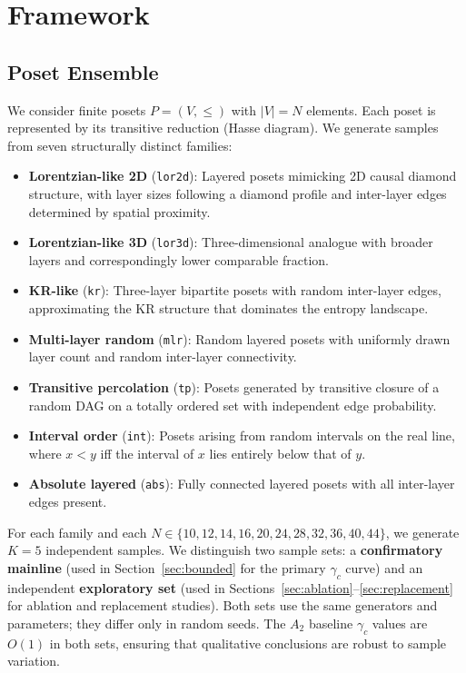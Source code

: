 \documentclass[11pt,a4paper]{article}
\begin{document}
\section{Framework}

\subsection{Poset Ensemble}

We consider finite posets $P = (V, \leq)$ with $|V| = N$ elements. Each poset is represented by its transitive reduction (Hasse diagram). We generate samples from seven structurally distinct families:

\begin{itemize}[nosep]
    \item \textbf{Lorentzian-like 2D} (\texttt{lor2d}): Layered posets mimicking 2D causal diamond structure, with layer sizes following a diamond profile and inter-layer edges determined by spatial proximity.
    \item \textbf{Lorentzian-like 3D} (\texttt{lor3d}): Three-dimensional analogue with broader layers and correspondingly lower comparable fraction.
    \item \textbf{KR-like} (\texttt{kr}): Three-layer bipartite posets with random inter-layer edges, approximating the KR structure that dominates the entropy landscape.
    \item \textbf{Multi-layer random} (\texttt{mlr}): Random layered posets with uniformly drawn layer count and random inter-layer connectivity.
    \item \textbf{Transitive percolation} (\texttt{tp}): Posets generated by transitive closure of a random DAG on a totally ordered set with independent edge probability.
    \item \textbf{Interval order} (\texttt{int}): Posets arising from random intervals on the real line, where $x < y$ iff the interval of $x$ lies entirely below that of $y$.
    \item \textbf{Absolute layered} (\texttt{abs}): Fully connected layered posets with all inter-layer edges present.
\end{itemize}

For each family and each $N \in \{10, 12, 14, 16, 20, 24, 28, 32, 36, 40, 44\}$, we generate $K = 5$ independent samples. We distinguish two sample sets: a \textbf{confirmatory mainline} (used in Section~\ref{sec:bounded} for the primary $\gamma_c$ curve) and an independent \textbf{exploratory set} (used in Sections~\ref{sec:ablation}--\ref{sec:replacement} for ablation and replacement studies). Both sets use the same generators and parameters; they differ only in random seeds. The $A_2$ baseline $\gamma_c$ values are $O(1)$ in both sets, ensuring that qualitative conclusions are robust to sample variation.
\end{document}
